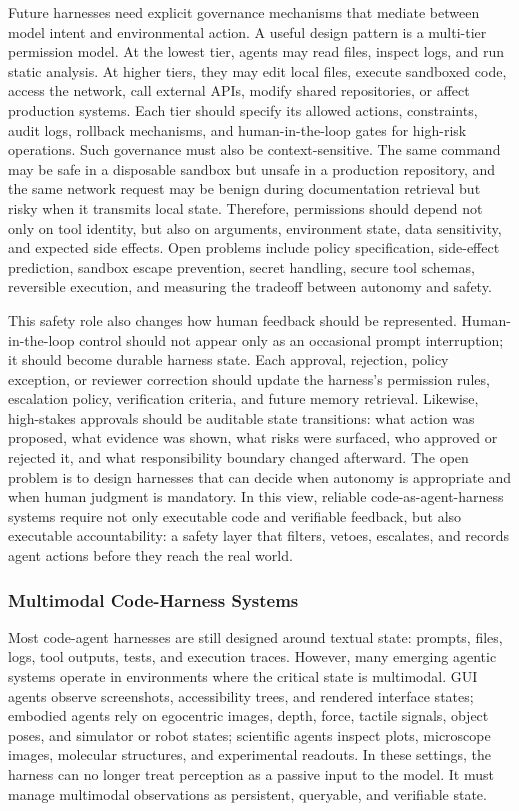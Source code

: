 Future harnesses need explicit governance mechanisms that mediate between model intent and environmental action. A useful design pattern is a multi-tier permission model. At the lowest tier, agents may read files, inspect logs, and run static analysis. At higher tiers, they may edit local files, execute sandboxed code, access the network, call external APIs, modify shared repositories, or affect production systems. Each tier should specify its allowed actions, constraints, audit logs, rollback mechanisms, and human-in-the-loop gates for high-risk operations. Such governance must also be context-sensitive. The same command may be safe in a disposable sandbox but unsafe in a production repository, and the same network request may be benign during documentation retrieval but risky when it transmits local state. Therefore, permissions should depend not only on tool identity, but also on arguments, environment state, data sensitivity, and expected side effects. Open problems include policy specification, side-effect prediction, sandbox escape prevention, secret handling, secure tool schemas, reversible execution, and measuring the tradeoff between autonomy and safety.


This safety role also changes how human feedback should be represented. Human-in-the-loop control should not appear only as an occasional prompt interruption; it should become durable harness state. Each approval, rejection, policy exception, or reviewer correction should update the harness's permission rules, escalation policy, verification criteria, and future memory retrieval. Likewise, high-stakes approvals should be auditable state transitions: what action was proposed, what evidence was shown, what risks were surfaced, who approved or rejected it, and what responsibility boundary changed afterward. The open problem is to design harnesses that can decide when autonomy is appropriate and when human judgment is mandatory. In this view, reliable code-as-agent-harness systems require not only executable code and verifiable feedback, but also executable accountability: a safety layer that filters, vetoes, escalates, and records agent actions before they reach the real world.

\subsubsection{Multimodal Code-Harness Systems}

Most code-agent harnesses are still designed around textual state: prompts, files, logs, tool outputs, tests, and execution traces. However, many emerging agentic systems operate in environments where the critical state is multimodal. GUI agents observe screenshots, accessibility trees, and rendered interface states; embodied agents rely on egocentric images, depth, force, tactile signals, object poses, and simulator or robot states; scientific agents inspect plots, microscope images, molecular structures, and experimental readouts. In these settings, the harness can no longer treat perception as a passive input to the model. It must manage multimodal observations as persistent, queryable, and verifiable state.

